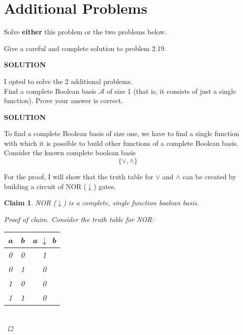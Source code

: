 \documentclass{exam} %
\newcommand{\cl}[1]{\mathcal{#1}}  %
\theoremstyle{plain}
\newtheorem{claim}[thm]{Claim}      \newtheorem*{claim*}{Claim}
\theoremstyle{definition}
\theoremstyle{remark}
\newenvironment{claimproof} {
  \begin{proof}[Proof of claim]
  \renewcommand{\qedsymbol}{\ensuremath{\bullet}}
  } {
  \end{proof}
  }
\numberwithin{equation}{section}  %
\newcommand{\sol}{\begin{center}\textbf{SOLUTION}\end{center}}
\begin{document}
\section{Additional Problems}
\begin{questions}
\question Solve \textbf{either} this problem or the two problems below.

\smallskip

Give a careful and complete solution to problem 2.19.
\sol
I opted to solve the 2 additional problems.\\
\question Find a complete Boolean basis $\cl{A}$ of size 1 (that is, it
consists of just a single function). Prove your answer is correct.
\sol
To find a complete Boolean basis of size one, we have to find a single function
with which it is possible to build other functions of a complete Boolean basis.\\

Consider the known complete boolean basis \[ \{ \lor, \land \} \]

For the proof, I will show that the truth table for $\lor$ and $\land$ can be 
created by building a circuit of NOR ($\downarrow$) gates.
  \begin{claim} NOR ($\downarrow$) is a complete, single function boolean 
    basis.\\
    \begin{claimproof} 
    Consider the truth table for NOR:\\
      \begin{tabular}{cc|c}
        a & b & a $\downarrow$ b \\
        \hline
        0 & 0 & 1 \\
        0 & 1 & 0 \\
        1 & 0 & 0 \\
        1 & 1 & 0 \\
      \end{tabular}\\


\end{claimproof}
\end{claim}
\end{questions}
\end{document}

